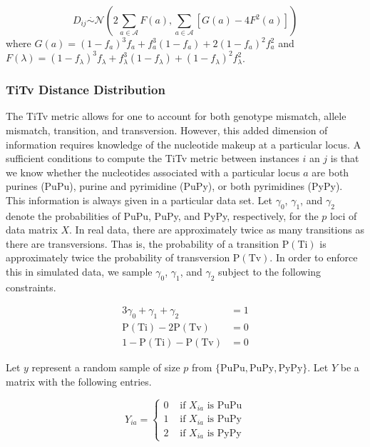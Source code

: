 \documentclass[10pt,letterpaper]{article}\usepackage[]{graphicx}\usepackage[]{color}
\begin{document}
\begin{equation}\label{eq:DDistr_AM}
D_{ij} \overset{.}{\sim} \mathcal{N}\left(2\sum_{a \in \mathcal{A}} F(a), \sum_{a \in \mathcal{A}} \left[G(a)- 4F^2(a)\right]\right)
\end{equation}
where $G(a) = (1 - f_a)^3 f_a + f^3_a (1 - f_a) + 2 (1 - f_a)^2 f^2_a$ and $F(\lambda) = (1 - f_\lambda)^3 f_\lambda + f^3_\lambda (1 - f_\lambda) + (1 - f_\lambda)^2 f^2_\lambda$.

\subsubsection{TiTv Distance Distribution}

The TiTv metric allows for one to account for both genotype mismatch, allele mismatch, transition, and transversion. However, this added dimension of information requires knowledge of the nucleotide makeup at a particular locus. A sufficient conditions to compute the TiTv metric between instances $i$ an $j$ is that we know whether the nucleotides associated with a particular locus $a$ are both purines (PuPu), purine and pyrimidine (PuPy), or both pyrimidines (PyPy). This information is always given in a particular data set. Let $\gamma_0$, $\gamma_1$, and $\gamma_2$ denote the probabilities of PuPu, PuPy, and PyPy, respectively, for the $p$ loci of data matrix $X$. In real data, there are approximately twice as many transitions as there are transversions. Thas is, the probability of a transition $\text{P}(\text{Ti})$ is approximately twice the probability of transversion $\text{P}(\text{Tv})$. In order to enforce this in simulated data, we sample $\gamma_0$, $\gamma_1$, and $\gamma_2$ subject to the following constraints.

\begin{alignat}{3}\label{eq:TiTv_constraints1}
\gamma_0 + \gamma_1 + \gamma_2 &= 1 \\ \label{eq:TiTv_constraints2}
\text{P}(\text{Ti}) - 2 \text{P}(\text{Tv}) &= 0 \\ \label{eq:TiTv_constraints3}
1 - \text{P}(\text{Ti}) - \text{P}(\text{Tv}) &= 0
\end{alignat}

Let $y$ represent a random sample of size $p$ from $\{\text{PuPu}, \text{PuPy}, \text{PyPy}\}$. Let $Y$ be a matrix with the following entries.

\begin{equation}\label{eq:Ymat}
Y_{ia} = \begin{cases}
0 & \text{ if } X_{ia} \text{ is PuPu} \\
1 & \text{ if } X_{ia} \text{ is PuPy} \\
2 & \text{ if } X_{ia} \text{ is PyPy}
\end{cases}
\end{equation}
\end{document}
